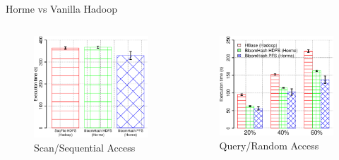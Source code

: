 \documentclass[newPxFont]{beamer}
\begin{document}
\begin{frame}[c]{Horme vs Vanilla Hadoop}
\vspace{-1.5cm}
\begin{columns}[T] %
    \begin{column}{.48\textwidth}
    \begin{figure}[ht!]
      \includegraphics[scale=0.3]{eval-scan}
      \centering
      \caption{Scan/Sequential Access}
    \end{figure}
    \end{column}%
    \hfill%
    \begin{column}{.48\textwidth}
    \begin{figure}[ht!]
      \includegraphics[scale=0.3]{eval-random}
      \centering
      \caption{Query/Random Access}
    \end{figure} 
    \end{column}%
\end{columns}  
\end{frame}
\end{document}
